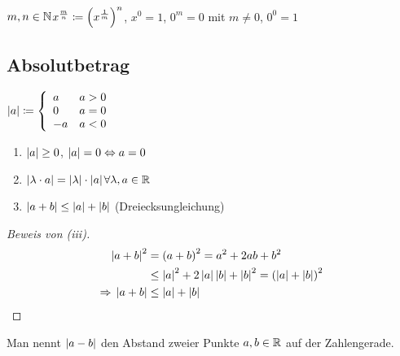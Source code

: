\begin{definition}
    $m,n\in\mathbb{N}$\quad $x^\frac{m}{n}\coloneqq \left(x^\frac{1}{m}\right)^n$, $x^0 = 1$, $0^m = 0$ mit $m\neq 0$, $0^0 = 1$
\end{definition}

\subsection{Absolutbetrag}

\begin{definition}[Betrag]
    $\left\lvert a\right\rvert \coloneqq \left\{ \begin{array}{lr}
                                    a  & a>0 \\
                                    0  & a=0 \\
                                    -a & a<0
    \end{array}\right.$
\end{definition}

\begin{satz}
    \theoremescape
    \begin{enumerate}[label=(\roman*)]
        \item $\left\lvert a\right\rvert \geq 0$, $\left\lvert a\right\rvert = 0 \Leftrightarrow{} a = 0$
        \item $\left\lvert\lambda\cdot a\right\rvert = \left\lvert\lambda\right\rvert\cdot\left\lvert a\right\rvert$\quad $\forall \lambda, a \in \mathbb{R}$
        \item $\left\lvert a+b\right\rvert\leq \left\lvert a\right\rvert+\left\lvert b\right\rvert$ (Dreiecksungleichung) %
    \end{enumerate}
    \begin{proof}[Beweis von (iii)]
        \begin{align*}
            \left\lvert a+b\right\rvert^2 &= \left(a+b\right)^2 = a^2 + 2ab + b^2\\
            &\leq \left\lvert a\right\rvert^2 + 2\left\lvert a\right\rvert\left\lvert b\right\rvert + \left\lvert b\right\rvert^2 = \left(\left\lvert a\right\rvert+\left\lvert b\right\rvert\right)^2\\
            \Rightarrow{} \left\lvert a+b\right\rvert&\leq\left\lvert a\right\rvert+\left\lvert b\right\rvert\qedhere
        \end{align*}
    \end{proof}
\end{satz}

\begin{definition}
    Man nennt $\left\lvert a-b\right\rvert$ den Abstand zweier Punkte $a,b\in\mathbb{R}$ auf der Zahlengerade.
\end{definition}


